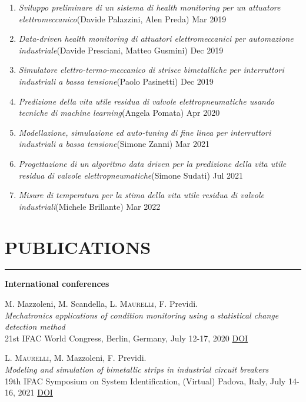\documentclass[10pt]{article}
\newcommand{\cvsection}[1]{\section*{\centering\normalsize\uppercase{#1}}\vspace{-16pt}\rule{\linewidth}{0.2pt}\vspace{6pt}}
\begin{document}
\begin{enumerate}
	\setlength\itemsep{-14pt}
	\item \textit{Sviluppo preliminare di un sistema di health monitoring per un attuatore elettromeccanico}\hfill{\scriptsize (Davide Palazzini, Alen Preda)} Mar 2019\\
	\item \textit{Data-driven health monitoring di attuatori elettromeccanici per automazione industriale}\hfill{\scriptsize(Davide Presciani, Matteo Gusmini)} Dec 2019\\
	\item \textit{Simulatore elettro-termo-meccanico di strisce bimetalliche per interruttori industriali a bassa tensione}\hfill{\scriptsize(Paolo Pasinetti)} Dec 2019\\
	\item \textit{Predizione della vita utile residua di valvole elettropneumatiche usando tecniche di machine learning}\hfill{\scriptsize(Angela Pomata)} Apr 2020\\
	\item \textit{Modellazione, simulazione ed auto-tuning di fine linea per interruttori industriali a bassa tensione}\hfill{\scriptsize(Simone Zanni)} Mar 2021\\
	\item \textit{Progettazione di un algoritmo data driven
	per la predizione della vita utile residua di
	valvole elettropneumatiche}\hfill{\scriptsize(Simone Sudati)} Jul 2021\\
	\item \textit{Misure di temperatura per la stima della vita utile residua di valvole industriali}\hfill{\scriptsize(Michele Brillante)} Mar 2022\\
\end{enumerate}
\clearpage
\pagestyle{fancy}
\cvsection{publications}
\textbf{International conferences}
\begin{enumerate}[label={[C0{\arabic*}]}]
	\setlength\itemsep{-3pt}
	\item \label{c2020}M. Mazzoleni, M. Scandella, \textsc{L. Maurelli}, F. Previdi.\\
	\textit{Mechatronics applications of condition monitoring using a statistical change detection method}\\
	21st IFAC World Congress, Berlin, Germany, July 12-17, 2020 \hfill \href{https://doi.org/10.1016/j.ifacol.2020.12.100}{DOI}
	\item \label{c2021}\textsc{L. Maurelli}, M. Mazzoleni, F. Previdi.\\
	\textit{Modeling and simulation of bimetallic strips in industrial circuit breakers}\\
	19th IFAC Symposium on System Identification, (Virtual) Padova, Italy, July 14-16, 2021 \hfill \href{https://doi.org/10.1016/j.ifacol.2021.08.460}{DOI}
\end{enumerate}
\end{document}

